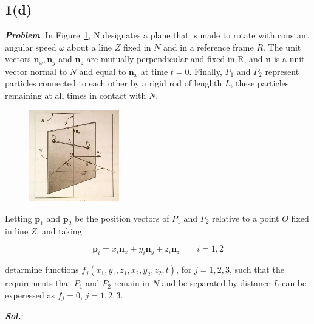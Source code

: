 \subsection{1(d)}
\textbf{\textit{Problem}}: In Figure~\ref{1_d}, N designates a plane that is made to rotate with constant angular speed $\omega$ about a line $Z$ fixed in $N$ and in a reference frame $R$. The unit vectors $\pmb n_x, \pmb n_y$ and  $\pmb n_z$ are mutually perpendicular and fixed in R, and $\pmb n$ is a unit vector normal to $N$ and equal to $\pmb n_x$ at time $t=0$. Finally, $P_1$ and $P_2$ represent particles connected to each other by a rigid rod of lenghth $L$, these particles remaining at all times in contact with $N$.

\begin{figure}[H]
    \centering
    \includegraphics[width = 0.35\textwidth, height = 0.3\textwidth]{figs/ProbSet_1/1_d.jpg}
    \caption{}
    \label{1_d}
\end{figure}


Letting $\pmb p_1$ and $\pmb p_2$ be the position vectors of $P_1$ and $P_2$ relative to a point $O$ fixed in line $Z$, and taking

$$\pmb p_i = x_i \pmb n_x + y_i \pmb n_y + z_i \pmb n_z \qquad i = 1, 2$$

detarmine functions $f_j(x_1, y_1, z_1, x_2, y_2, z_2, t)$, for $j=1, 2, 3$, such that the requirements that $P_1$ and $P_2$ remain in $N$ and be separated by distance $L$ can be experessed as $f_j = 0$, $j = 1, 2, 3$.

\textbf{\textit{Sol.}}:

